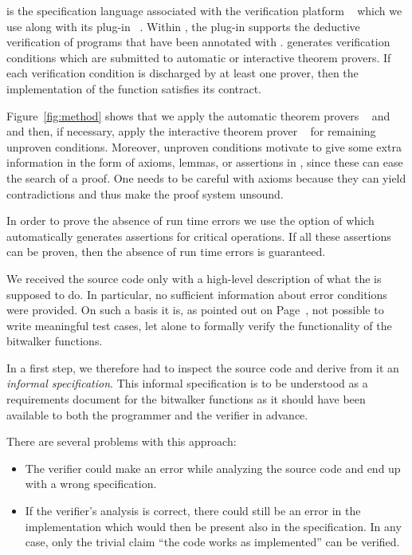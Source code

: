 \acsl is the specification language associated with 
the verification platform \framac~\cite{FramaC}
which we use along with its plug-in \framacwp~\cite{wp}.
Within \framac, the \wpframac plug-in supports
the deductive verification of \isoc programs that have been annotated with \acsl.
\framacwp generates verification conditions which are submitted to 
automatic or interactive theorem provers.
If each verification condition is discharged by at least one prover, then
the implementation of the function satisfies its contract.

Figure~\ref{fig:method} shows that we apply the automatic
theorem provers \altergo~\cite{alt-ergo} and \cvc~\cite{cvc}
and then, if necessary, apply the interactive theorem prover \coq~\cite{Coq}
for remaining unproven conditions.
Moreover, unproven conditions motivate to give some extra information
in the form of axioms, lemmas, or assertions in \acsl, 
since these can ease the search of a proof.
One needs to be careful with axioms because they can yield contradictions
and thus make the proof system unsound.

In order to prove the absence of run time errors we use
the  option of \wpframac which automatically generates \acsl
assertions for critical operations.
If all these assertions can be proven, then
the absence of run time errors is guaranteed.


We received the source code only with a high-level description
of what the \bitwalker is supposed to do.
In particular, no sufficient information about error conditions were provided.
On such a basis it is, as pointed out on Page~\pageref{lesson},
not possible to write meaningful test cases,
let alone to formally verify the functionality of the bitwalker functions.

In a first step, we therefore had to inspect the source code and 
derive from it an \emph{informal specification}.
This informal specification is to be understood
as a requirements document for the bitwalker functions as it should have been
available to both the programmer and the verifier in advance.

There are several problems with this approach:
\begin{itemize}
\item
The verifier could make an error while analyzing the source code
and end up with a wrong specification. 

\item
If the verifier's analysis is correct,
there could still be an error in the implementation which would then be present also
in the specification. In any case, only the trivial claim ``the code
works as implemented'' can be verified.
\end{itemize}

